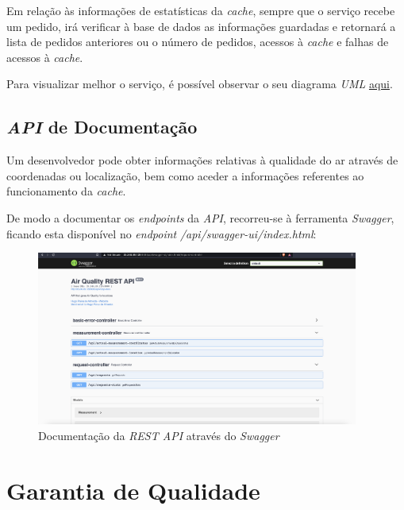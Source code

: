 \documentclass[10pt,english]{article}
\begin{document}
\par Em relação às informações de estatísticas da \textit{cache}, sempre que o serviço recebe um pedido, irá verificar à base de dados as informações guardadas e retornará a lista de pedidos anteriores ou o número de pedidos, acessos à \textit{cache} e falhas de acessos à \textit{cache}.

\par Para visualizar melhor o serviço, é possível observar o seu diagrama \textit{UML} \href{https://github.com/hugofpaiva/tqs-p1/tree/main/report/source/images/air-quality-service-uml.png}{aqui}.

\subsection{\textit{API} de Documentação}

\par Um desenvolvedor pode obter informações relativas à qualidade do ar através de coordenadas ou localização, bem como aceder a informações referentes ao funcionamento da \textit{cache}. 

\par De modo a documentar os \textit{endpoints} da \textit{API}, recorreu-se à ferramenta \textit{Swagger}, ficando esta disponível no \textit{endpoint} \textit{/api/swagger-ui/index.html}:

\begin{figure}[h]
    \centering
    \includegraphics[width=400]{images/swagger.png}
    \caption{Documentação da \textit{REST API} através do \textit{Swagger}}
\end{figure}

\section{Garantia de Qualidade}
\end{document}
